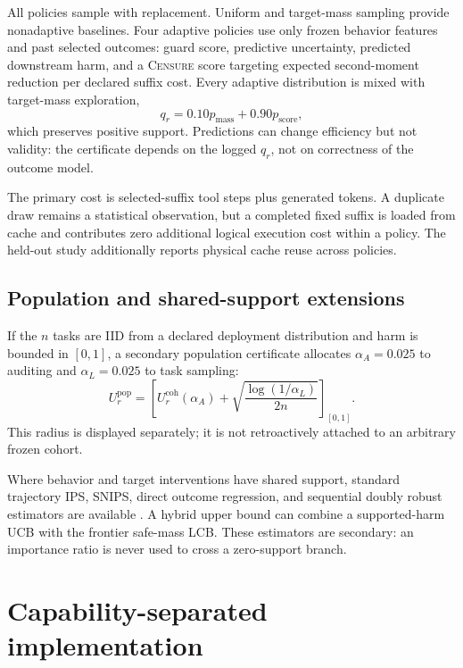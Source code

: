 \documentclass{article}
\newcommand{\method}{\textsc{Censure}}
\begin{document}
All policies sample with replacement. Uniform and target-mass sampling provide nonadaptive
baselines. Four adaptive policies use only frozen behavior features and past selected outcomes:
guard score, predictive uncertainty, predicted downstream harm, and a \method{} score targeting
expected second-moment reduction per declared suffix cost. Every adaptive distribution is mixed
with target-mass exploration,
\begin{equation}
  q_r=0.10p_{\mathrm{mass}}+0.90p_{\mathrm{score}},
\end{equation}
which preserves positive support. Predictions can change efficiency but not validity: the
certificate depends on the logged $q_r$, not on correctness of the outcome model.

The primary cost is selected-suffix tool steps plus generated tokens. A duplicate draw remains a
statistical observation, but a completed fixed suffix is loaded from cache and contributes zero
additional logical execution cost within a policy. The held-out study additionally reports
physical cache reuse across policies.

\subsection{Population and shared-support extensions}

If the $n$ tasks are IID from a declared deployment distribution and harm is bounded in $[0,1]$,
a secondary population certificate allocates $\alpha_A=0.025$ to auditing and
$\alpha_L=0.025$ to task sampling:
\begin{equation}
  U^{\mathrm{pop}}_r=
  \left[U^{\mathrm{coh}}_r(\alpha_A)+
  \sqrt{\frac{\log(1/\alpha_L)}{2n}}\right]_{[0,1]}.
  \label{eq:population}
\end{equation}
This radius is displayed separately; it is not retroactively attached to an arbitrary frozen
cohort.

Where behavior and target interventions have shared support, standard trajectory IPS, SNIPS,
direct outcome regression, and sequential doubly robust estimators are available
\citep{dudik2011doubly,jiang2016doubly,thomas2015hcope}. A hybrid upper bound can combine a
supported-harm UCB with the frontier safe-mass LCB. These estimators are secondary: an importance
ratio is never used to cross a zero-support branch.

\section{Capability-separated implementation}
\label{sec:implementation}
\end{document}
